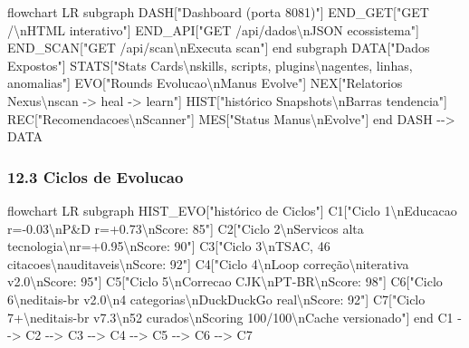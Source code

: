 \documentclass[
  12pt,
]{article}
\newenvironment{Shaded}{}{}
\newcommand{\NormalTok}[1]{#1}
\begin{document}
\begin{Shaded}
\begin{Highlighting}[]
\NormalTok{flowchart LR}
\NormalTok{subgraph DASH["Dashboard (porta 8081)"]}
\NormalTok{END\_GET["GET /\textbackslash{}nHTML interativo"]}
\NormalTok{END\_API["GET /api/dados\textbackslash{}nJSON ecossistema"]}
\NormalTok{END\_SCAN["GET /api/scan\textbackslash{}nExecuta scan"]}
\NormalTok{end}
\NormalTok{subgraph DATA["Dados Expostos"]}
\NormalTok{STATS["Stats Cards\textbackslash{}nskills, scripts, plugins\textbackslash{}nagentes, linhas, anomalias"]}
\NormalTok{EVO["Rounds Evolucao\textbackslash{}nManus Evolve"]}
\NormalTok{NEX["Relatorios Nexus\textbackslash{}nscan {-}\textgreater{} heal {-}\textgreater{} learn"]}
\NormalTok{HIST["histórico Snapshots\textbackslash{}nBarras tendencia"]}
\NormalTok{REC["Recomendacoes\textbackslash{}nScanner"]}
\NormalTok{MES["Status Manus\textbackslash{}nEvolve"]}
\NormalTok{end}
\NormalTok{DASH {-}{-}\textgreater{} DATA}
\end{Highlighting}
\end{Shaded}

\subsubsection{12.3 Ciclos de Evolucao}\label{ciclos-de-evolucao}

\begin{Shaded}
\begin{Highlighting}[]
\NormalTok{flowchart LR}
\NormalTok{subgraph HIST\_EVO["histórico de Ciclos"]}
\NormalTok{C1["Ciclo 1\textbackslash{}nEducacao r={-}0.03\textbackslash{}nP\&D r=+0.73\textbackslash{}nScore: 85"]}
\NormalTok{C2["Ciclo 2\textbackslash{}nServicos alta tecnologia\textbackslash{}nr=+0.95\textbackslash{}nScore: 90"]}
\NormalTok{C3["Ciclo 3\textbackslash{}nTSAC, 46 citacoes\textbackslash{}nauditaveis\textbackslash{}nScore: 92"]}
\NormalTok{C4["Ciclo 4\textbackslash{}nLoop correção\textbackslash{}niterativa v2.0\textbackslash{}nScore: 95"]}
\NormalTok{C5["Ciclo 5\textbackslash{}nCorrecao CJK\textbackslash{}nPT{-}BR\textbackslash{}nScore: 98"]}
\NormalTok{C6["Ciclo 6\textbackslash{}neditais{-}br v2.0\textbackslash{}n4 categorias\textbackslash{}nDuckDuckGo real\textbackslash{}nScore: 92"]}
\NormalTok{C7["Ciclo 7+\textbackslash{}neditais{-}br v7.3\textbackslash{}n52 curados\textbackslash{}nScoring 100/100\textbackslash{}nCache versionado"]}
\NormalTok{end}
\NormalTok{C1 {-}{-}\textgreater{} C2 {-}{-}\textgreater{} C3 {-}{-}\textgreater{} C4 {-}{-}\textgreater{} C5 {-}{-}\textgreater{} C6 {-}{-}\textgreater{} C7}
\end{Highlighting}
\end{Shaded}
\end{document}
